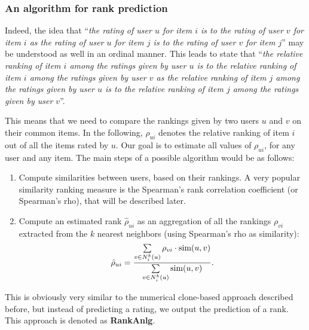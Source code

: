 \subsubsection{An algorithm for rank prediction}
Indeed, the idea that ``\textit{the rating of user $u$ for item $i$ is to the
rating of user $v$ for item $i$ as the rating of user $u$ for item $j$ is to
the rating of user $v$ for item $j$}'' may be understood  as well in an ordinal
manner. This leads to state that ``\textit{the relative ranking of item $i$
  among the ratings given by user $u$  is to the relative ranking of item $i$
  among the ratings given by user $v$ as the relative ranking of item $j$ among
  the ratings given by user $u$  is to the relative ranking of item $j$ among
the ratings given by user $v$}''.

This means that we need to compare the rankings given by two users $u$ and $v$
on their common items. In the following, $\rho_{ui}$ denotes the relative
ranking of item $i$ out of all the items rated by $u$. Our goal is to estimate
all values of $\rho_{ui}$, for any user and any item. The main steps of a
possible algorithm would be as follows:
\begin{enumerate}
  \item Compute similarities between users, based on their rankings. A very
    popular similarity ranking measure is the Spearman's rank correlation
    coefficient (or Spearman's rho), that will be described later.
  \item Compute an estimated rank $\hat{\rho}_{ui}$ as an aggregation of all the
    rankings $\rho_{vi}$ extracted from the $k$ nearest neighbors (using
    Spearman's rho as similarity):
    $$\hat{\rho}_{ui} = \frac{\sum\limits_{v \in N_i^k(u)} \rho_{vi} \cdot
    \text{sim}(u, v)}{\sum\limits_{v \in N_i^k(u)} \text{sim}(u, v)}.$$
\end{enumerate}

This is obviously very similar to the numerical clone-based approach described
before, but instead of predicting a rating, we output the prediction of a rank. This
approach is denoted as \textbf{RankAnlg}.

